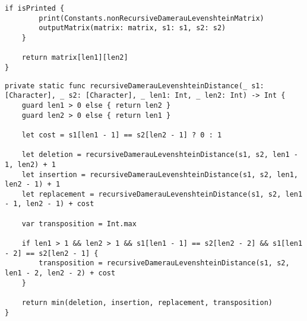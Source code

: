\begin{lstlisting}[label=lst:nonRecursiveDamerauLevenshteinDistance2,caption=Продолжение листинга \ref{lst:nonRecursiveDamerauLevenshteinDistance}]
	if isPrinted { 
		print(Constants.nonRecursiveDamerauLevenshteinMatrix)
		outputMatrix(matrix: matrix, s1: s1, s2: s2) 
	}

	return matrix[len1][len2]
}
\end{lstlisting}

\clearpage

\begin{lstlisting}[label=lst:recursiveDamerauLevenshteinDistance,caption=Функция нахождения расстояния Дамерау~---~Левенштейна рекурсивно]
private static func recursiveDamerauLevenshteinDistance(_ s1: [Character], _ s2: [Character], _ len1: Int, _ len2: Int) -> Int {
	guard len1 > 0 else { return len2 }
	guard len2 > 0 else { return len1 }

	let cost = s1[len1 - 1] == s2[len2 - 1] ? 0 : 1

	let deletion = recursiveDamerauLevenshteinDistance(s1, s2, len1 - 1, len2) + 1
	let insertion = recursiveDamerauLevenshteinDistance(s1, s2, len1, len2 - 1) + 1
	let replacement = recursiveDamerauLevenshteinDistance(s1, s2, len1 - 1, len2 - 1) + cost

	var transposition = Int.max

	if len1 > 1 && len2 > 1 && s1[len1 - 1] == s2[len2 - 2] && s1[len1 - 2] == s2[len2 - 1] {
		transposition = recursiveDamerauLevenshteinDistance(s1, s2, len1 - 2, len2 - 2) + cost
	}

	return min(deletion, insertion, replacement, transposition)
}
\end{lstlisting}

\clearpage


